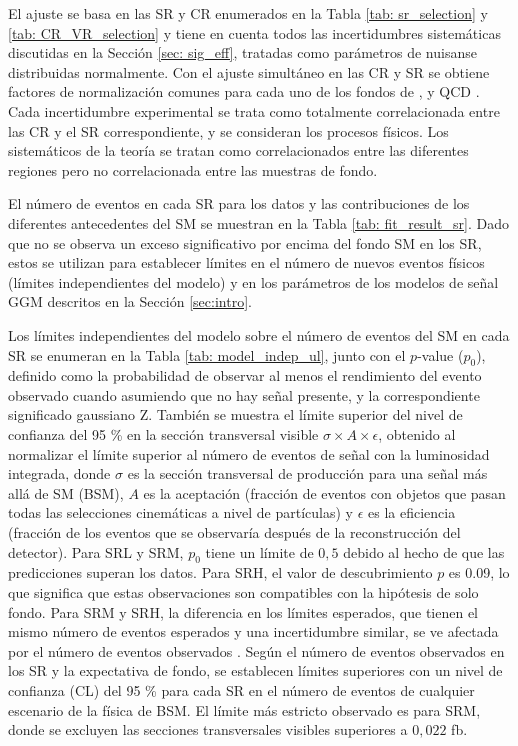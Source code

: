 El ajuste se basa en las SR y CR enumerados en la Tabla
\ref{tab: sr_selection} y \ref{tab: CR_VR_selection} y tiene en cuenta todos las
incertidumbres sistemáticas discutidas en la Sección \ref{sec: sig_eff}, tratadas como parámetros de nuisanse distribuidas normalmente. Con el ajuste simultáneo en
las CR y SR se obtiene factores de normalización comunes para cada uno de los fondos de {\wph},
{\ttbarph} y QCD {\phj}. Cada incertidumbre experimental se trata como totalmente correlacionada entre las CR y el SR correspondiente, y se consideran los procesos físicos. Los sistemáticos de la teoría se tratan como correlacionados entre las diferentes regiones pero no correlacionada entre las muestras de fondo.

El número de eventos en cada SR para los datos y las contribuciones de los diferentes antecedentes del SM se muestran en la Tabla \ref{tab: fit_result_sr}. Dado que no se observa un exceso significativo por encima del fondo SM en los SR, estos se utilizan para establecer límites en el número de nuevos eventos físicos (límites independientes del modelo) y en los parámetros de los modelos de señal GGM descritos en la Sección \ref{sec:intro}.

Los límites independientes del modelo sobre el número de eventos del SM en cada SR se enumeran en la Tabla \ref{tab: model_indep_ul}, junto con el $p$-value ($p_{0}$), definido como la probabilidad de observar al menos el rendimiento del evento observado cuando asumiendo que no hay señal presente, y la correspondiente significado gaussiano Z. También
se muestra el límite superior del nivel de confianza del 95 \% en la sección transversal visible $\sigma \times A \times \epsilon$, obtenido al normalizar el límite superior al número de eventos de señal con la luminosidad integrada, donde $\sigma$ es la sección transversal de producción para una señal más allá de SM (BSM), $A$ es la aceptación (fracción de eventos con objetos que pasan todas las selecciones cinemáticas a nivel de partículas) y $\epsilon$ es la eficiencia (fracción de los eventos que se observaría después de la reconstrucción del detector).
Para SRL y SRM, $p_{0}$ tiene un límite de $0,5$ debido al hecho de que las predicciones superan los datos. Para SRH, el valor de descubrimiento $p$ es 0.09, lo que significa que estas observaciones son compatibles con la hipótesis de solo fondo. Para SRM y SRH, la diferencia en los límites esperados, que tienen el mismo número de eventos esperados y una incertidumbre similar, se ve afectada por el número de eventos observados \cite{Cowan: 2010js}. Según el número de eventos observados en los SR y la expectativa de fondo, se establecen límites superiores con un nivel de confianza (CL) del 95 \% para cada SR en el número de eventos de cualquier escenario de la física de BSM.
El límite más estricto observado es para SRM, donde se excluyen las secciones transversales visibles superiores a $0,022$ fb.

